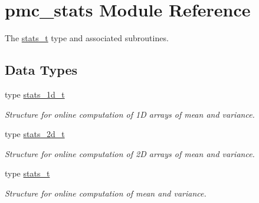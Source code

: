\hypertarget{namespacepmc__stats}{}\section{pmc\+\_\+stats Module Reference}
\label{namespacepmc__stats}


The {\ttfamily \mbox{\hyperlink{structpmc__stats_1_1stats__t}{stats\+\_\+t}}} type and associated subroutines.  


\subsection*{Data Types}
\begin{DoxyCompactItemize}
\item 
type \mbox{\hyperlink{structpmc__stats_1_1stats__1d__t}{stats\+\_\+1d\+\_\+t}}
\begin{DoxyCompactList}\small\item\em Structure for online computation of 1D arrays of mean and variance. \end{DoxyCompactList}\item 
type \mbox{\hyperlink{structpmc__stats_1_1stats__2d__t}{stats\+\_\+2d\+\_\+t}}
\begin{DoxyCompactList}\small\item\em Structure for online computation of 2D arrays of mean and variance. \end{DoxyCompactList}\item 
type \mbox{\hyperlink{structpmc__stats_1_1stats__t}{stats\+\_\+t}}
\begin{DoxyCompactList}\small\item\em Structure for online computation of mean and variance. \end{DoxyCompactList}\end{DoxyCompactItemize}
